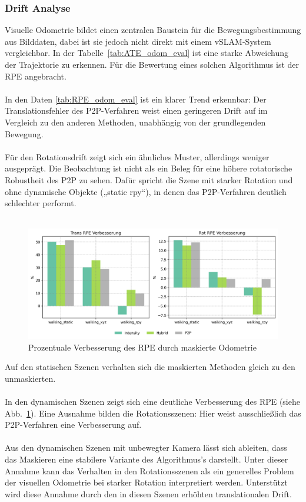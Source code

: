 \documentclass[12pt,DIV=15,BCOR=15mm,twoside,headsepline,abstract=true,listof=totoc,bibliography=totoc]{scrreprt}
\theoremstyle{remark}    %
\begin{document}
    \subsubsection{Drift Analyse}
    Visuelle Odometrie bildet einen zentralen Baustein für die Bewegungsbestimmung aus Bilddaten, dabei ist sie jedoch nicht direkt mit einem 
    \ac{vSLAM}-System vergleichbar. 
    In der Tabelle~\ref{tab:ATE_odom_eval} ist eine starke Abweichung der Trajektorie zu erkennen. Für die Bewertung eines solchen Algorithmus ist der \ac{RPE} 
    angebracht.\\\\
    In den Daten \ref{tab:RPE_odom_eval} ist ein klarer Trend erkennbar: Der Translationsfehler des \ac{P2P}-Verfahren weist einen geringeren Drift auf 
    im Vergleich zu den anderen Methoden, unabhängig von der grundlegenden Bewegung. \\\\
    Für den Rotationsdrift zeigt sich ein ähnliches Muster, allerdings weniger ausgeprägt. Die Beobachtung ist nicht als ein Beleg für eine höhere rotatorische 
    Robustheit des \ac{P2P} zu sehen.
    Dafür spricht die Szene mit starker Rotation und ohne dynamische Objekte („static rpy“), in denen das \ac{P2P}-Verfahren deutlich schlechter performt.\\\\
    \begin{figure}[ht]
        \centering
        \includegraphics[width=\textwidth]{pics/rel_imp_walking_rpy.png}
        \caption{Prozentuale Verbesserung des RPE durch maskierte Odometrie}
        \label{fig:rel_imp_odom_RPE}
    \end{figure}   
    Auf den statischen Szenen verhalten sich die maskierten Methoden gleich zu den unmaskierten.\\\\
    In den dynamischen Szenen zeigt sich eine deutliche Verbesserung des \ac{RPE} (siehe Abb.~\ref{fig:rel_imp_odom_RPE}). Eine Ausnahme bilden die Rotationsszenen: 
    Hier weist ausschließlich das \ac{P2P}-Verfahren eine Verbesserung auf. \\\\
    Aus den dynamischen Szenen mit unbewegter Kamera lässt sich ableiten, dass das Maskieren eine stabilere Variante des Algorithmus's darstellt.
    Unter dieser Annahme kann das Verhalten in den Rotationsszenen als ein generelles Problem der visuellen Odometrie bei starker Rotation interpretiert werden.
    Unterstützt wird diese Annahme durch den in diesen Szenen erhöhten translationalen Drift.
    
\end{document}
